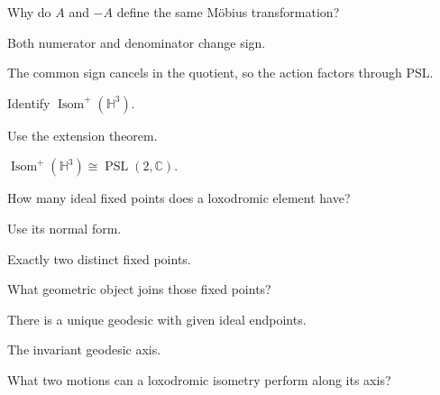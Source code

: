 \begin{exercise}\label{exr:vii36-13}
Why do \(A\) and \(-A\) define the same Möbius transformation?
\end{exercise}

\begin{hint}
Both numerator and denominator change sign.
\end{hint}

\begin{solution}
The common sign cancels in the quotient, so the action factors through PSL.
\end{solution}

\begin{exercise}\label{exr:vii36-14}
Identify \(\operatorname{Isom}^+(\mathbb H^3)\).
\end{exercise}

\begin{hint}
Use the extension theorem.
\end{hint}

\begin{solution}
\(\operatorname{Isom}^+(\mathbb H^3)\cong\operatorname{PSL}(2,\mathbb C)\).
\end{solution}

\begin{exercise}\label{exr:vii36-15}
How many ideal fixed points does a loxodromic element have?
\end{exercise}

\begin{hint}
Use its normal form.
\end{hint}

\begin{solution}
Exactly two distinct fixed points.
\end{solution}

\begin{exercise}\label{exr:vii36-16}
What geometric object joins those fixed points?
\end{exercise}

\begin{hint}
There is a unique geodesic with given ideal endpoints.
\end{hint}

\begin{solution}
The invariant geodesic axis.
\end{solution}

\begin{exercise}\label{exr:vii36-17}
What two motions can a loxodromic isometry perform along its axis?
\end{exercise}


